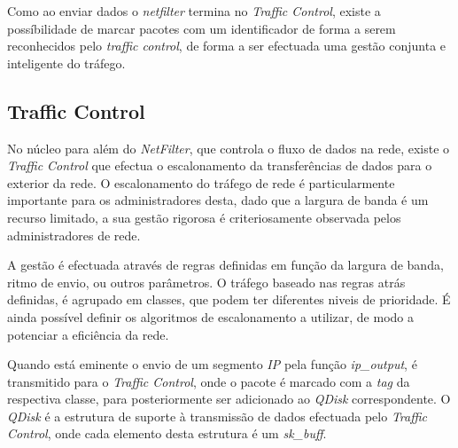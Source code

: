 Como ao enviar dados o \textit{netfilter} termina no \textit{Traffic Control}, existe a possíbilidade de marcar pacotes com um identificador de forma a serem reconhecidos pelo \textit{traffic control}, de forma a ser efectuada uma gestão conjunta e inteligente do tráfego.

\subsection{Traffic Control}
\label{sub:traffic_control}


No núcleo para além do \textit{NetFilter}, que controla o fluxo de dados na rede, existe o \textit{Traffic Control} que efectua o escalonamento da transferências de dados para o exterior da rede.
O escalonamento do tráfego de rede é particularmente importante para os administradores desta, dado que a largura de banda é um recurso limitado, a sua gestão rigorosa é criteriosamente observada pelos administradores de rede.

A gestão é efectuada através de regras definidas em função da largura de banda, ritmo de envio, ou outros parâmetros.
O tráfego baseado nas regras atrás definidas, é agrupado em classes, que podem ter diferentes niveis de prioridade.
É ainda possível definir os algoritmos de escalonamento a utilizar, de modo a potenciar a eficiência da rede.

Quando está eminente o envio de um \color{red}segmento \color{black}\textit{IP} pela função \textit{ip\_output}, é transmitido para o \textit{Traffic Control}, onde o pacote é marcado com a \textit{tag} da respectiva classe, para posteriormente ser adicionado ao \textit{QDisk} correspondente.
O \textit{QDisk} é a estrutura de suporte à transmissão de dados efectuada pelo \textit{Traffic Control}, onde cada elemento desta estrutura é um \textit{sk\_buff}.


